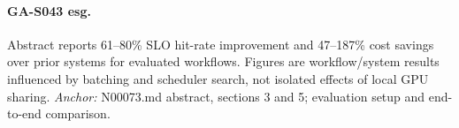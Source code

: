 \paragraph{GA-S043 esg.} Abstract reports 61–80\% SLO hit-rate improvement and 47–187\% cost savings over prior systems for evaluated workflows. Figures are workflow/system results influenced by batching and scheduler search, not isolated effects of local GPU sharing. \textit{Anchor:} N00073.md abstract, sections 3 and 5; evaluation setup and end-to-end comparison.

